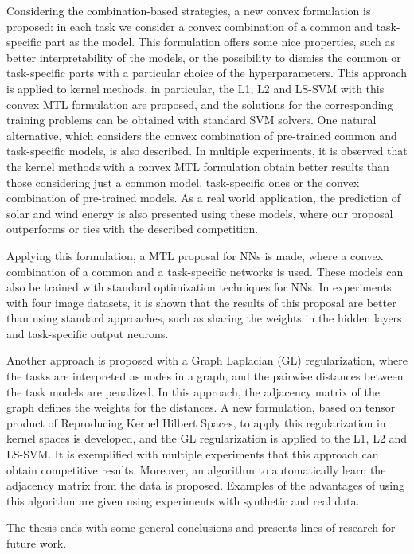 \documentclass[a4paper, 11pt]{Thesis}  %
\begin{document}
{{Considering the combination-based strategies, a new convex formulation is proposed: in each task we consider a convex combination of a common and task-specific part as the model. This formulation offers some nice properties, such as better interpretability of the models, or the possibility to dismiss the common or task-specific parts with a particular choice of the hyperparameters.
This approach is applied to kernel methods, in particular, the L1, L2 and LS-SVM with this convex MTL formulation are proposed, and the solutions for the corresponding training problems can be obtained with standard SVM solvers.
One natural alternative, which considers the convex combination of pre-trained common and task-specific models, is also described.
In multiple experiments, it is observed that the kernel methods with a convex MTL formulation obtain better results than those considering just a common model, task-specific ones or the convex combination of pre-trained models.
As a real world application, the prediction of solar and wind energy is also presented using these models, where our proposal outperforms or ties with the described competition.

%
Applying this formulation, a MTL proposal for NNs is made, where a convex combination of a common and a task-specific networks is used. These models can also be trained with standard optimization techniques for NNs.
In experiments with four image datasets, it is shown that the results of this proposal are better than using standard approaches, such as sharing the weights in the hidden layers and task-specific output neurons.


Another approach is proposed with a Graph Laplacian (GL) regularization, where the tasks are interpreted as nodes in a graph, and the pairwise distances between the task models are penalized. In this approach, the adjacency matrix of the graph defines the weights for the distances. A new formulation, based on tensor product of Reproducing Kernel Hilbert Spaces, to apply this regularization in kernel spaces is developed, and the GL regularization is applied to the L1, L2 and LS-SVM. 
It is exemplified with multiple experiments that this approach can obtain competitive results. 
%
Moreover, an algorithm to automatically learn the adjacency matrix from the data is proposed. Examples of the advantages of using this algorithm are given using experiments with synthetic and real data.

The thesis ends with some general conclusions and presents lines of research for future work. 
%
}

}
\end{document}
